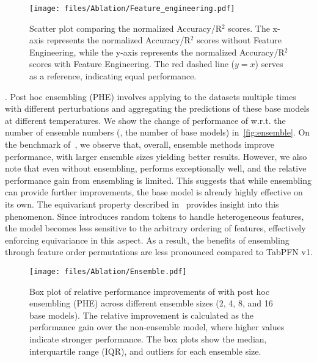 \begin{figure}
    \centering
    \texttt{[image: files/Ablation/Feature\_engineering.pdf]}
    \caption{Scatter plot comparing the normalized Accuracy/R$^2$ scores. The x-axis represents the normalized Accuracy/R$^2$ scores without Feature Engineering, while the y-axis represents the normalized Accuracy/R$^2$ scores with Feature Engineering. The red dashed line ($y = x$) serves as a reference, indicating equal performance.}
    \vspace{-5mm}
    \label{fig:engineering}
\end{figure}

. Post hoc ensembling (PHE) involves applying \ours to the datasets multiple times with different perturbations and aggregating the predictions of these base models at different temperatures. We show the change of performance of \ours w.r.t. the number of ensemble numbers (\ie, the number of base models) in~\autoref{fig:ensemble}. On the benchmark of~\citet{Ye2024Closer}, we observe that, overall, ensemble methods improve performance, with larger ensemble sizes yielding better results. However, we also note that even without ensembling, \ours performs exceptionally well, and the relative performance gain from ensembling is limited. This suggests that while ensembling can provide further improvements, the base \ours model is already highly effective on its own. 
The equivariant property described in~\cite{Arbel2025EquiTabPFN} provides insight into this phenomenon. Since \ours introduces random tokens to handle heterogeneous features, the model becomes less sensitive to the arbitrary ordering of features, effectively enforcing equivariance in this aspect. As a result, the benefits of ensembling through feature order permutations are less pronounced compared to TabPFN v1.


\begin{figure}
    \centering
    \texttt{[image: files/Ablation/Ensemble.pdf]}
    \caption{Box plot of relative performance improvements of \ours with post hoc ensembling (PHE) across different ensemble sizes (2, 4, 8, and 16 base models). The relative improvement is calculated as the performance gain over the non-ensemble model, where higher values indicate stronger performance. The box plots show the median, interquartile range (IQR), and outliers for each ensemble size.}
    \vspace{-5mm}
    \label{fig:ensemble}
\end{figure}



